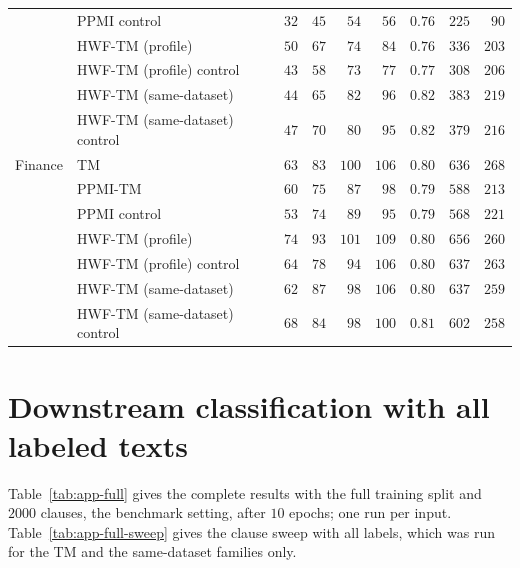 \begin{table}[H]
\begin{tabular}{llrrrrrrr}
 & PPMI control & $32$ & $45$ & $54$ & $56$ & $0.76$ & $225$ & $90$ \\
 & HWF-TM (profile) & $50$ & $67$ & $74$ & $84$ & $0.76$ & $336$ & $203$ \\
 & HWF-TM (profile) control & $43$ & $58$ & $73$ & $77$ & $0.77$ & $308$ & $206$ \\
 & HWF-TM (same-dataset) & $44$ & $65$ & $82$ & $96$ & $0.82$ & $383$ & $219$ \\
 & HWF-TM (same-dataset) control & $47$ & $70$ & $80$ & $95$ & $0.82$ & $379$ & $216$ \\
\midrule
Finance & TM & $63$ & $83$ & $100$ & $106$ & $0.80$ & $636$ & $268$ \\
 & PPMI-TM & $60$ & $75$ & $87$ & $98$ & $0.79$ & $588$ & $213$ \\
 & PPMI control & $53$ & $74$ & $89$ & $95$ & $0.79$ & $568$ & $221$ \\
 & HWF-TM (profile) & $74$ & $93$ & $101$ & $109$ & $0.80$ & $656$ & $260$ \\
 & HWF-TM (profile) control & $64$ & $78$ & $94$ & $106$ & $0.80$ & $637$ & $263$ \\
 & HWF-TM (same-dataset) & $62$ & $87$ & $98$ & $106$ & $0.80$ & $637$ & $259$ \\
 & HWF-TM (same-dataset) control & $68$ & $84$ & $98$ & $100$ & $0.81$ & $602$ & $258$ \\
\bottomrule
\end{tabular}
\end{table}

\section{Downstream classification with all labeled texts}
\label{app:full}

Table~\ref{tab:app-full} gives the complete results with the full training split and $2000$
clauses, the benchmark setting, after $10$ epochs; one run per input.
Table~\ref{tab:app-full-sweep} gives the clause sweep with all labels, which was run for the TM
and the same-dataset families only.

